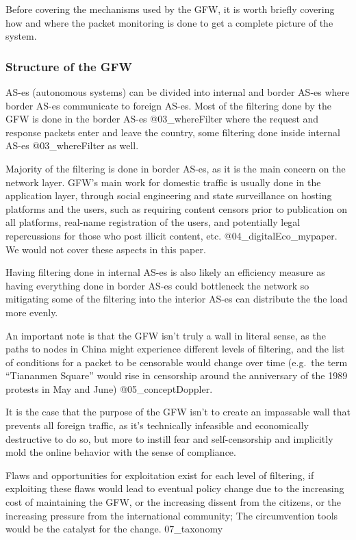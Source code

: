 Before covering the mechanisms used by the GFW, it is worth briefly
covering how and where the packet monitoring is done to get a complete
picture of the system.

\hypertarget{structure-of-the-gfw}{%
\subsubsection{Structure of the GFW}\label{structure-of-the-gfw}}

AS-es (autonomous systems) can be divided into internal and border AS-es
where border AS-es communicate to foreign AS-es. Most of the filtering
done by the GFW is done in the border AS-es @03\_whereFilter where the
request and response packets enter and leave the country, some filtering
done inside internal AS-es @03\_whereFilter as well.

Majority of the filtering is done in border AS-es, as it is the main
concern on the network layer. GFW's main work for domestic traffic is
usually done in the application layer, through social engineering and
state surveillance on hosting platforms and the users, such as requiring
content censors prior to publication on all platforms, real-name
registration of the users, and potentially legal repercussions for those
who post illicit content, etc. @04\_digitalEco\_mypaper. We would not
cover these aspects in this paper.

Having filtering done in internal AS-es is also likely an efficiency
measure as having everything done in border AS-es could bottleneck the
network so mitigating some of the filtering into the interior AS-es can
distribute the the load more evenly.

An important note is that the GFW isn't truly a wall in literal sense,
as the paths to nodes in China might experience different levels of
filtering, and the list of conditions for a packet to be censorable
would change over time (e.g.~the term ``Tiananmen Square'' would rise in
censorship around the anniversary of the 1989 protests in May and June)
@05\_conceptDoppler.

It is the case that the purpose of the GFW isn't to create an impassable
wall that prevents all foreign traffic, as it's technically infeasible
and economically destructive to do so, but more to instill fear and
self-censorship and implicitly mold the online behavior with the sense
of compliance.

Flaws and opportunities for exploitation exist for each level of
filtering, if exploiting these flaws would lead to eventual policy
change due to the increasing cost of maintaining the GFW, or the
increasing dissent from the citizens, or the increasing pressure from
the international community; The circumvention tools would be the
catalyst for the change. 07\_taxonomy

